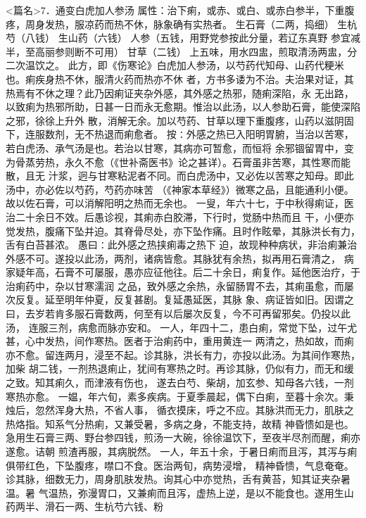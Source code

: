 \documentclass[a4paper,12pt,UTF8,twoside]{ctexbook}
\begin{document}
<篇名>7．通变白虎加人参汤
属性：治下痢，或赤、或白、或赤白参半，下重腹疼，周身发热，服凉药而热不休，脉象确有实热者。 
生石膏（二两，捣细） 生杭芍（八钱） 生山药（六钱） 人参（五钱，用野党参按此分量，若辽东真野 
参宜减半，至高丽参则断不可用） 甘草（二钱） 
上五味，用水四盅，煎取清汤两盅，分二次温饮之。 
此方，即《伤寒论》白虎加人参汤，以芍药代知母、山药代粳米也。痢疾身热不休，服清火药而热亦不休 
者，方书多诿为不治。夫治果对证，其热焉有不休之理？此乃因痢证夹杂外感，其外感之热邪，随痢深陷，永 
无出路，以致痢为热邪所助，日甚一日而永无愈期。惟治以此汤，以人参助石膏，能使深陷之邪，徐徐上升外 
散，消解无余。加以芍药、甘草以理下重腹疼，山药以滋阴固下，连服数剂，无不热退而痢愈者。 
按∶外感之热已入阳明胃腑，当治以苦寒，若白虎汤、承气汤是也。若治以甘寒，其病亦可暂愈，而恒将 
余邪锢留胃中，变为骨蒸劳热，永久不愈（《世补斋医书》论之甚详）。石膏虽非苦寒，其性寒而能散，且无 
汁浆，迥与甘寒粘泥者不同。而白虎汤中，又必佐以苦寒之知母。即此汤中，亦必佐以芍药，芍药亦味苦 
（《神家本草经》）微寒之品，且能通利小便。故以佐石膏，可以消解阳明之热而无余也。 
一叟，年六十七，于中秋得痢证，医治二十余日不效。后愚诊视，其痢赤白胶滞，下行时，觉肠中热而且 
干，小便亦觉发热，腹痛下坠并迫。其脊骨尽处，亦下坠作痛。且时作眩晕，其脉洪长有力，舌有白苔甚浓。 
愚曰∶此外感之热挟痢毒之热下 
迫，故现种种病状，非治痢兼治外感不可。遂投以此汤，两剂，诸病皆愈。其脉犹有余热，拟再用石膏清之， 
病家疑年高，石膏不可屡服，愚亦应征他往。后二十余日，痢复作。延他医治疗，于治痢药中，杂以甘寒濡润 
之品，致外感之余热，永留肠胃不去，其痢虽愈，而屡次反复。延至明年仲夏，反复甚剧。复延愚延医，其脉 
象、病证皆如旧。因谓之曰，去岁若肯多服石膏数两，何至有以后屡次反复，今不可再留邪矣。仍投以此汤， 
连服三剂，病愈而脉亦安和。 
一人，年四十二，患白痢，常觉下坠，过午尤甚，心中发热，间作寒热。医者于治痢药中，重用黄连一 
两清之，热如故，而痢亦不愈。留连两月，浸至不起。诊其脉，洪长有力，亦投以此汤。为其间作寒热，加柴 
胡二钱，一剂热退痢止，犹间有寒热之时。再诊其脉，仍似有力，而无和缓之致。知其痢久，而津液有伤也， 
遂去白芍、柴胡，加玄参、知母各六钱，一剂寒热亦愈。 
一媪，年六旬，素多疾病。于夏季晨起，偶下白痢，至暮十余次。秉烛后，忽然浑身大热，不省人事， 
循衣摸床，呼之不应。其脉洪而无力，肌肤之热烙指。知系气分热痢，又兼受暑，多病之身，不能支持，故精 
神昏愦如是也。急用生石膏三两、野台参四钱，煎汤一大碗，徐徐温饮下，至夜半尽剂而醒，痢亦遂愈。诘朝 
煎渣再服，其病脱然。 
一人，年五十余，于暑日痢而且泻，其泻与痢俱带红色，下坠腹疼，噤口不食。医治两旬，病势浸增， 
精神昏愦，气息奄奄。诊其脉，细数无力，周身肌肤发热。询其心中亦觉热，舌有黄苔，知其证夹杂暑温。暑 
气温热，弥漫胃口，又兼痢而且泻，虚热上逆，是以不能食也。遂用生山药两半、滑石一两、生杭芍六钱、粉 
\end{document}
